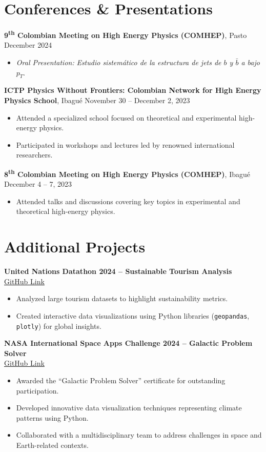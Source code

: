 \documentclass[a4paper,11pt]{article}
\begin{document}
\section*{Conferences \& Presentations}
\textbf{9\textsuperscript{th} Colombian Meeting on High Energy Physics (COMHEP)}, Pasto \hfill December 2024
\begin{itemize}
    \item \textit{Oral Presentation:} \textit{Estudio sistemático de la estructura de jets de $b$ y $\bar{b}$ a bajo $p_T$}.
\end{itemize}

\textbf{ICTP Physics Without Frontiers: Colombian Network for High Energy Physics School}, Ibagué \hfill November 30 -- December 2, 2023
\begin{itemize}
    \item Attended a specialized school focused on theoretical and experimental high-energy physics.
    \item Participated in workshops and lectures led by renowned international researchers.
\end{itemize}

\textbf{8\textsuperscript{th} Colombian Meeting on High Energy Physics (COMHEP)}, Ibagué \hfill December 4 -- 7, 2023 
\begin{itemize}
    \item Attended talks and discussions covering key topics in experimental and theoretical high-energy physics.
\end{itemize}

\section*{Additional Projects}
\textbf{United Nations Datathon 2024 -- Sustainable Tourism Analysis} \\
\href{https://github.com/JuanJ27/UN-Datathon-sisifos}{GitHub Link}
\begin{itemize}
    \item Analyzed large tourism datasets to highlight sustainability metrics.
    \item Created interactive data visualizations using Python libraries 
    (\texttt{geopandas}, \texttt{plotly}) for global insights.
\end{itemize}

\textbf{NASA International Space Apps Challenge 2024 -- Galactic Problem Solver} \\
\href{https://github.com/tonnysoyyo/NASA-Space-Apps}{GitHub Link}
\begin{itemize}
    \item Awarded the “Galactic Problem Solver” certificate for outstanding participation.
    \item Developed innovative data visualization techniques representing climate patterns using Python.
    \item Collaborated with a multidisciplinary team to address challenges in space and Earth-related contexts.
\end{itemize}
\end{document}
